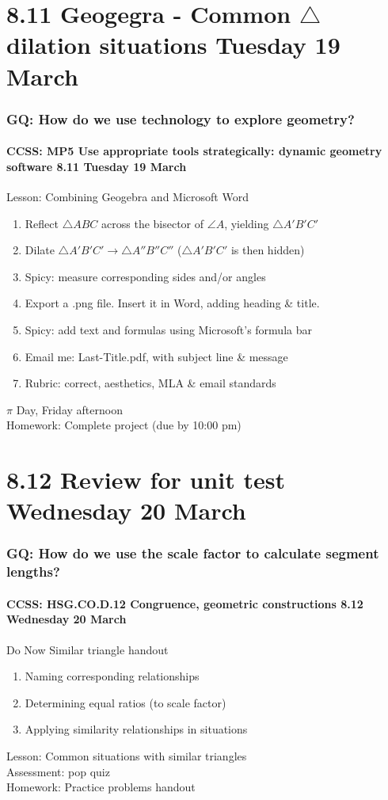 \documentclass{beamer}
\begin{document}
\section{8.11 Geogegra - Common $\triangle$ dilation situations Tuesday 19 March}
  \frame
  {
    \frametitle{GQ: How do we use technology to explore geometry?}
    \framesubtitle{CCSS: MP5 Use appropriate tools strategically: dynamic geometry software \hfill \alert{8.11 Tuesday 19 March}}

    \begin{block}{Lesson: Combining Geogebra and Microsoft Word}
      \begin{enumerate}
        \item Reflect $\triangle ABC$ across the bisector of $\angle A$, yielding $\triangle A'B'C'$
        \item Dilate $\triangle A'B'C' \rightarrow \triangle A''B''C''$ ($\triangle A'B'C'$ is then hidden)
        \item Spicy: measure corresponding sides and/or angles
        \item Export a .png file. Insert it in Word, adding heading \& title.
        \item Spicy: add text and formulas using Microsoft's formula bar
        \item Email me: Last-Title.pdf, with subject line \& message
        \item Rubric: correct, aesthetics, MLA \& email standards
      \end{enumerate}
    \end{block}
    \alert{$\pi$ Day, Friday afternoon}\\
    Homework: Complete project (due by 10:00 pm)
  }

\section{8.12 Review for unit test Wednesday 20 March}
  \frame
  {
    \frametitle{GQ: How do we use the scale factor to calculate segment lengths?}
    \framesubtitle{CCSS: HSG.CO.D.12 Congruence, geometric constructions \hfill \alert{8.12 Wednesday 20 March}}

    \begin{block}{Do Now Similar triangle handout}
      \begin{enumerate}
        \item Naming corresponding relationships
        \item Determining equal ratios (to scale factor)
        \item Applying similarity relationships in situations
      \end{enumerate}
    \end{block}
    Lesson: Common situations with similar triangles\\
    Assessment: pop quiz\\[0.5cm]
    Homework: Practice problems handout
  }
\end{document}
